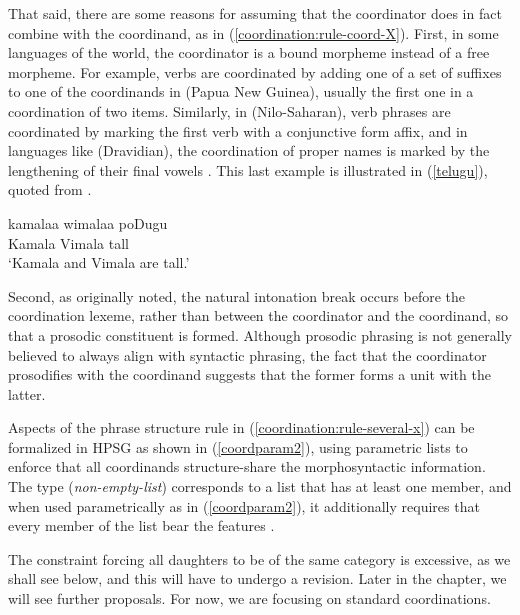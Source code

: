 That said, there are some reasons for assuming that the coordinator does in fact combine with the
coordinand, as in (\ref{coordination:rule-coord-X}). First, in some languages of the world, the
coordinator is a bound morpheme instead of a free morpheme. For example, verbs are coordinated by
adding one of a set of suffixes to one of the coordinands in  (Papua New Guinea),
usually the first one in a coordination of two items.
Similarly, in  (Nilo-Saharan), verb phrases are coordinated by marking the first verb
with a conjunctive form affix, and in languages like  (Dravidian), the coordination of
proper names is marked by the lengthening of their final vowels \citep[]{Drellishak:Bender:05}. This last example is illustrated in (\ref{telugu}), quoted from
.

\ea
\label{telugu}
\gll kamalaa wimalaa poDugu \\ 
     Kamala Vimala tall\\
\glt `Kamala and Vimala are tall.'
\z



Second, as \citet[165]{ross67} originally noted, the natural intonation break occurs before the
coordination lexeme, rather than between the coordinator and the coordinand, so that a  prosodic
constituent is formed. Although prosodic phrasing is not generally believed to always align with
syntactic phrasing, the fact that the coordinator prosodifies with the  coordinand suggests that the
former forms a unit with the latter. 

 Aspects of the phrase structure rule in (\ref{coordination:rule-several-x}) can be formalized in HPSG as
 shown in  (\ref{coordparam2}),  using parametric lists  \citep[, fn.\,2]{pollardsag} to enforce
 that all coordinands structure-share the morphosyntactic information. The type  (\textit{non-empty-list}) corresponds
 to a list that has at least one member, and when used parametrically as in (\ref{coordparam2}), it additionally requires that
 every member of the list bear the features
 .

\ea 
{}\label{coordparam2}
\z

\noindent
The constraint forcing all daughters to be of the same category is excessive, as we shall see below,
and this will have to undergo a revision. Later in the chapter, we will see further proposals. For
now, we are focusing on standard coordinations. 

